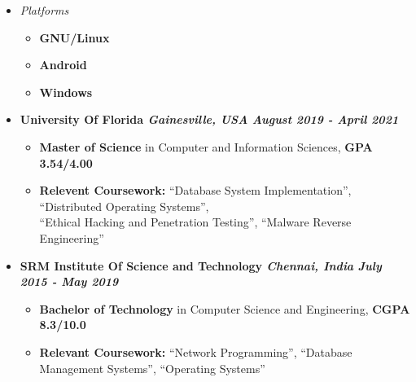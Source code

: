 \documentclass[9]{Resume}
\begin{document}
\begin{minipage}[t]{0.45\textwidth}
\begin{itemize}[noitemsep,nolistsep,leftmargin=*]
    \item[]\textit{Platforms}
            \vspace{-1em}
            \begin{multicols}{2}
            \begin{itemize}[leftmargin=*]
            \setlength\itemsep{-0.25em}
            \item[]\textbf{GNU/Linux}\hspace{5pt}
            \item[]\textbf{Android}\hspace{20pt}
            \item[]\textbf{Windows}\hspace{3pt}
            \end{itemize}
            \end{multicols}
    \end{itemize}
        
\end{minipage}


\begin{itemize}[noitemsep,nolistsep]
    \item[]\textbf{University Of Florida \textit{{\scriptsize Gainesville, USA}} \hfill \textit{August 2019 - April 2021}}
        \begin{itemize}[leftmargin=*]
            \setlength\itemsep{-0.25em}
            \item[\textbullet]{\footnotesize \textbf{Master of Science} in Computer and Information Sciences, \textbf{GPA 3.54/4.00}}
            \item[\textbullet]{\footnotesize \textbf{Relevent Coursework:}
                ``Database System Implementation'', ``Distributed Operating Systems'',\\
                ``Ethical Hacking and Penetration Testing'', ``Malware Reverse Engineering''}
        \end{itemize}
    \item[]\textbf{SRM Institute Of Science and Technology \textit{{\scriptsize Chennai, India}} \hfill \textit{July 2015 - May 2019}}
        \begin{itemize}[leftmargin=*]
            \setlength\itemsep{-0.25em}
            \item[\textbullet]{\footnotesize \textbf{Bachelor of Technology} in Computer Science and Engineering, \textbf{CGPA 8.3/10.0}}
            \item[\textbullet]{\footnotesize \textbf{Relevant Coursework:}
                                        ``Network Programming'', ``Database Management Systems'', ``Operating Systems''}
        \end{itemize}
\end{itemize}
\end{document}
